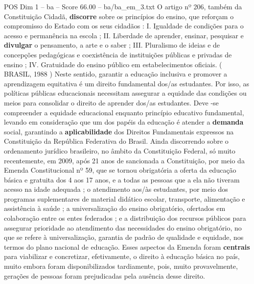 \begin{textsample}{POS Dim 1 – ba – Score 66.00 – ba/ba\_em\_3.txt}
O artigo nº 206, também da Constituição Cidadã, \textbf{discorre} sobre os princípios do ensino, que reforçam o compromisso do Estado com os seus cidadãos : I.
Igualdade de condições para o acesso e permanência na escola ; II.
Liberdade de aprender, ensinar, pesquisar e \textbf{divulgar} o pensamento, a arte e o saber ; III.
Pluralismo de ideias e de concepções pedagógicas e coexistência de instituições públicas e privadas de ensino ; IV.
Gratuidade do ensino público em estabelecimentos oficiais. ( BRASIL, 1988 ) Neste sentido, garantir a educação inclusiva e promover a aprendizagem equitativa é um direito fundamental dos/as estudantes.
Por isso, as políticas públicas educacionais necessitam assegurar a equidade das condições ou meios para consolidar o direito de aprender dos/as estudantes.
Deve -se compreender a equidade educacional enquanto princípio educativo fundamental, levando em consideração que um dos papéis da educação é atender a \textbf{demanda} social, garantindo a \textbf{aplicabilidade} dos Direitos Fundamentais expressos na Constituição da República Federativa do Brasil.
Ainda discorrendo sobre o ordenamento jurídico brasileiro, no âmbito da Constituição Federal, só muito recentemente, em 2009, após 21 anos de sancionada a Constituição, por meio da Emenda Constitucional nº 59, que se tornou obrigatória a oferta da educação básica e gratuita dos 4 aos 17 anos, e a todas as pessoas que a ela não tiveram acesso na idade adequada ; o atendimento aos/às estudantes, por meio dos programas suplementares de material didático escolar, transporte, alimentação e assistência à saúde ; a universalização do ensino obrigatório, ofertados em colaboração entre os entes federados ; e a distribuição dos recursos públicos para assegurar prioridade ao atendimento das necessidades do ensino obrigatório, no que se refere à universalização, garantia de padrão de qualidade e equidade, nos termos do plano nacional de educação.
Esses aspectos da Emenda foram \textbf{centrais} para viabilizar e concretizar, efetivamente, o direito à educação básica no país, muito embora foram disponibilizados tardiamente, pois, muito provavelmente, gerações de pessoas foram prejudicadas pela ausência desse direito.

\end{textsample}
